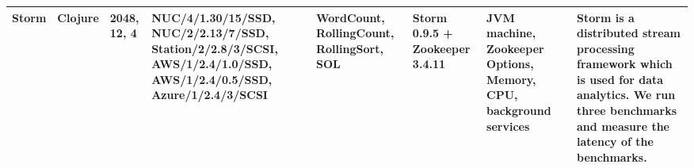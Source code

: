 \begin{table*}[t]
{\begin{tabular}{@{}lp{1cm}p{1.6cm}p{2cm}p{2.3cm}p{0.5cm}p{1.2cm}p{3.5cm}@{}}
\rowcolor[HTML]{EFEFEF}
Storm & Clojure & 2048, 12, 4 & NUC/4/1.30/15/SSD, NUC/2/2.13/7/SSD, Station/2/2.8/3/SCSI, AWS/1/2.4/1.0/SSD, AWS/1/2.4/0.5/SSD, Azure/1/2.4/3/SCSI & WordCount, RollingCount, RollingSort, SOL & Storm 0.9.5 + Zookeeper 3.4.11 & JVM machine, Zookeeper Options, Memory, CPU, background services & {\sc Storm} is a distributed stream processing framework which is used for data analytics. We run three benchmarks and measure the latency of the benchmarks. \\ 
\bottomrule
\end{tabular}
}

\end{table*}